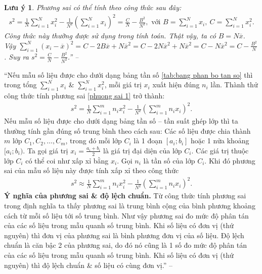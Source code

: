 \documentclass[oneside]{book}
\numberwithin{equation}{section}
\newtheorem{luuy}{Lưu ý}[section]
\begin{document}
\begin{luuy}
	Phương sai có thể tính theo công thức sau đây:
	\begin{align}
		\label{phuong sai 1}
		s^2 = \frac{1}{N}\sum_{i=1}^N x_i^2 - \frac{1}{N^2}\left(\sum_{i=1}^N x_i\right)^2 = \frac{C}{N} - \frac{B^2}{N^2},\mbox{ với } B = \sum_{i=1}^N x_i,\ C = \sum_{i=1}^N x_i^2.
	\end{align}
	Công thức này thường được sử dụng trong tính toán. Thật vậy, ta có $B = N\overline{x}$. Vậy $\sum_{i=1}^N \left(x_i - \overline{x}\right)^2 = C - 2B\overline{x} + N\overline{x}^2 = C - 2N\overline{x}^2 + N\overline{x}^2 = C - N\overline{x}^2 = C - \frac{B^2}{N}$. Suy ra $s^2 = \frac{C}{N} - \frac{B^2}{N^2}$.'' -- \cite[pp. 74--75]{TL_chuyen_Toan_Dai_So_Giai_Tich_11}
\end{luuy}
``Nếu mẫu số liệu được cho dưới dạng bảng tần số \ref{tab:bang phan bo tan so} thì trong tổng $\sum_{i=1}^N x_i$ \& $\sum_{i=1}^N x_i^2$, mỗi giá trị $x_i$ xuất hiện đúng $n_i$ lần. Thành thử công thức tính phương sai \eqref{phuong sai 1} trở thành:
\begin{align*}
	s^ 2 = \frac{1}{N}\sum_{i=1}^m n_ix_i^2 - \frac{1}{N^2}\left(\sum_{i=1}^m n_ix_i\right)^2.
\end{align*}
Nếu mẫu số liệu được cho dưới dạng bảng tần số -- tần suất ghép lớp thì ta thường tính gần đúng số trung bình theo cách sau: Các số liệu được chia thành $m$ lớp $C_1,C_2,\ldots,C_m$, trong đó mỗi lớp $C_i$ là 1 đoạn $[a_i;b_i]$ hoặc 1 nửa khoảng $[a_i;b_i)$. Ta gọi giá trị $x_i = \frac{a_i + b_i}{2}$ là giá trị đại diện của lớp $C_i$. Các giá trị thuộc lớp $C_i$ có thể coi như xấp xỉ bằng $x_i$. Gọi $n_i$ là tần số của lớp $C_i$. Khi đó phương sai của mẫu số liệu này được tính xấp xỉ theo công thức
\begin{align*}
	s^2\approx\frac{1}{N}\sum_{i=1}^m n_ix_i^2 - \frac{1}{N^2}\left(\sum_{i=1}^m n_ix_i\right)^2.
\end{align*}
\textbf{Ý nghĩa của phương sai \& độ lệch chuẩn.} Từ công thức tính phương sai trong định nghĩa ta thấy phương sai là trung bình cộng của bình phương khoảng cách từ mỗi số liệu tới số trung bình. Như vậy phương sai đo mức độ phân tán của các số liệu trong mẫu quanh số trung bình. Khi số liệu có đơn vị (thứ nguyên) thì đơn vị của phương sai là bình phương đơn vị của số liệu. Độ lệch chuẩn là căn bậc 2 của phương sai, do đó nó cũng là 1 số đo mức độ phân tán của các số liệu trong mẫu quanh số trung bình. Khi số liệu có đơn vị (thứ nguyên) thì độ lệch chuẩn \& số liệu có cùng đơn vị.'' -- \cite[pp. 76--77]{TL_chuyen_Toan_Dai_So_Giai_Tich_11}
\end{document}
